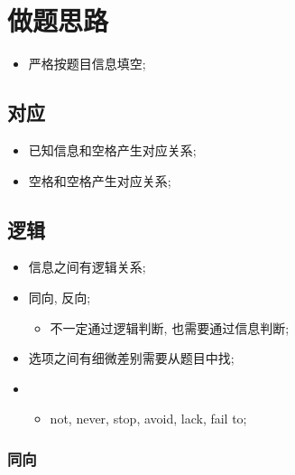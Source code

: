 \chapter{做题思路}

\begin{itemize}
  \item 严格按题目信息填空;
\end{itemize}

\section{对应}

  \begin{itemize}
    \item 已知信息和空格产生对应关系;
    \item 空格和空格产生对应关系;
  \end{itemize}

\section{逻辑}

  \begin{itemize}
    \item 信息之间有逻辑关系;
    \item 同向, 反向;
    \begin{itemize}
      \item 不一定通过逻辑判断, 也需要通过信息判断;
    \end{itemize}

    \item 选项之间有细微差别需要从题目中找;
    \item {}
    \begin{itemize}
      \item not, never, stop, avoid, lack, fail to;
    \end{itemize}
  \end{itemize}

  \subsection{同向}


